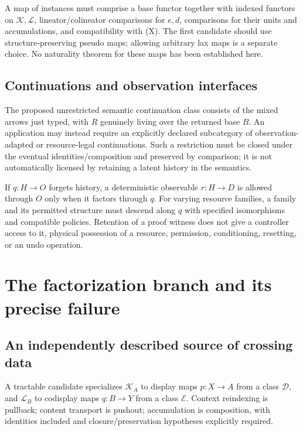 \documentclass[11pt,a4paper]{article}
\newcommand{\E}{\mathcal E}
\newcommand{\D}{\mathcal D}
\newcommand{\K}{\mathcal K}
\newcommand{\Lcat}{\mathcal L}
\begin{document}
A map of instances must comprise a base functor together with indexed functors
on \(\K,\Lcat\), lineator/colineator comparisons for \(e,d\), comparisons for
their units and accumulations, and compatibility with (X). The first candidate
should use structure-preserving pseudo maps; allowing arbitrary lax maps is a
separate choice. No naturality theorem for these maps has been established here.

\subsection{Continuations and observation interfaces}

The proposed unrestricted semantic continuation class consists of the mixed
arrows just typed, with \(R\) genuinely living over the returned base \(B\).
An application may instead require an explicitly declared subcategory of
observation-adapted or resource-legal continuations. Such a restriction must be
closed under the eventual identities/composition and preserved by comparison;
it is not automatically licensed by retaining a latent history in the semantics.

If \(q:H\to O\) forgets history, a deterministic observable
\(r:H\to D\) is allowed through \(O\) only when it factors through \(q\).
For varying resource families, a family and its permitted structure must descend
along \(q\) with specified isomorphisms and compatible policies. Retention of a
proof witness does not give a controller access to it, physical possession of a
resource, permission, conditioning, resetting, or an undo operation.

\section{The factorization branch and its precise failure}

\subsection{An independently described source of crossing data}

A tractable candidate specializes \(\K_A\) to display maps \(p:X\to A\)
from a class \(\D\), and \(\Lcat_B\) to codisplay maps \(q:B\to Y\) from a
class \(\E\). Context reindexing is pullback; content transport is pushout;
accumulation is composition, with identities included and closure/preservation
hypotheses explicitly required.
\end{document}
